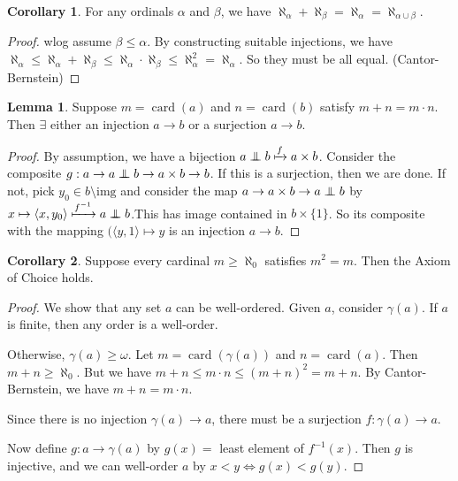 \documentclass[a4paper]{article}
\theoremstyle{definition}
\newtheorem*{lemma}{Lemma}
\newtheorem*{cor}{Corollary}
\newcommand{\bra}{\langle}
\newcommand{\ket}{\rangle}
\newcommand{\oadd}{\mathrel\bot\joinrel\mspace{-8mu}\mathrel\bot}
\DeclareMathOperator\card{card}
\begin{document}
\begin{cor}
  For any ordinals $\alpha$ and $\beta$, we have $\aleph_\alpha + \aleph_\beta = \aleph_\alpha = \aleph_{\alpha\cup\beta}$.
\end{cor}

\begin{proof}
  wlog assume $\beta \leq \alpha$. By constructing suitable injections, we have $\aleph_{\alpha} \leq \aleph_{\alpha} + \aleph_{\beta} \leq \aleph_\alpha\cdot \aleph_\beta \leq \aleph_\alpha^2 = \aleph_\alpha$. So they must be all equal. (Cantor-Bernstein)
\end{proof}

\begin{lemma}
  Suppose $m = \card (a)$ and $n = \card(b)$ satisfy $m + n = m\cdot n$. Then $\exists$ either an injection $a\to b$ or a surjection $a\to b$.
\end{lemma}

\begin{proof}
  By assumption, we have a bijection $a\oadd b\xmapsto{f} a\times b$. Consider the composite $g: a\to a\oadd b \to a\times b\to b$. If this is a surjection, then we are done. If not, pick $y_0\in b\setminus\mathrm{img}$ and consider the map $a\to a\times b\to a\oadd b$ by $x\mapsto \bra x, y_0\ket \xmapsto{f^{-1}} a\oadd b$.This has image contained in $b\times \{1\}$. So its composite with the mapping $(\bra y, 1\ket \mapsto y$ is an injection $a\to b$.
\end{proof}

\begin{cor}
  Suppose every cardinal $m\geq \aleph_0$ satisfies $m^2 = m$. Then the Axiom of Choice holds.
\end{cor}

\begin{proof}
  We show that any set $a$ can be well-ordered. Given $a$, consider $\gamma(a)$. If $a$ is finite, then any order is a well-order. 

  Otherwise, $\gamma(a) \geq \omega$. Let $m = \card(\gamma(a))$ and $n = \card(a)$. Then $m + n \geq \aleph_0$. But we have $m + n \leq m\cdot n \leq (m + n)^2 = m + n$. By Cantor-Bernstein, we have $m + n = m\cdot n$.

  Since there is no injection $\gamma(a) \to a$, there must be a surjection $f: \gamma(a)\to a$.

Now define $g: a\to \gamma(a)$ by $g(x) =$ least element of $f^{-1}(x)$. Then $g$ is injective, and we can well-order $a$ by $x < y \Leftrightarrow g(x) < g(y)$.
\end{proof}
\end{document}
